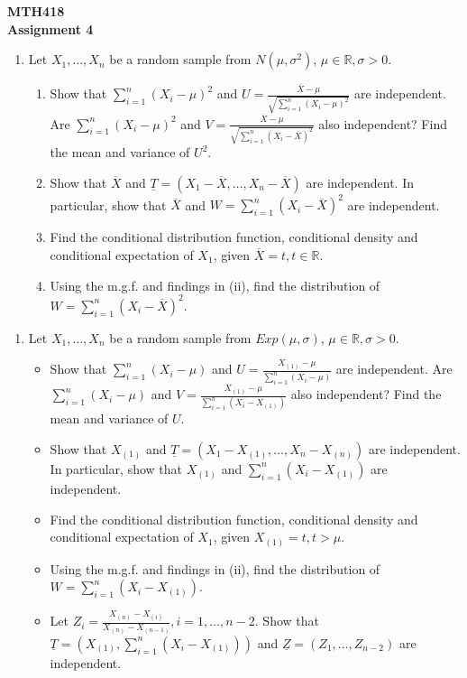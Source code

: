\documentclass[11pt]{article}
\begin{document}
\begin{center}
    \textbf{MTH418} \\
    \textbf{Assignment 4}
\end{center}

\begin{enumerate}
    \item[1.] Let $X_1, \dots, X_n$ be a random sample from $N(\mu, \sigma^2)$, $\mu \in \mathbb{R}, \sigma > 0$.
    \begin{enumerate}
        \item[(i)] Show that $\sum_{i=1}^n (X_i - \mu)^2$ and $U = \frac{\overline{X} - \mu}{\sqrt{\sum_{i=1}^n (X_i - \mu)^2}}$ are independent. Are $\sum_{i=1}^n (X_i - \mu)^2$ and $V = \frac{\overline{X} - \mu}{\sqrt{\sum_{i=1}^n (X_i - \overline{X})^2}}$ also independent? Find the mean and variance of $U^2$.
        \item[(ii)] Show that $\overline{X}$ and $\underline{T} = (X_1 - \overline{X}, \dots, X_n - \overline{X})$ are independent. In particular, show that $\overline{X}$ and $W = \sum_{i=1}^n (X_i - \overline{X})^2$ are independent.
        \item[(iii)] Find the conditional distribution function, conditional density and conditional expectation of $X_1$, given $\overline{X} = t, t \in \mathbb{R}$.
        \item[(iv)] Using the m.g.f. and findings in (ii), find the distribution of $W = \sum_{i=1}^n (X_i - \overline{X})^2$.
    \end{enumerate}
\end{enumerate}

\vspace{1em}

\begin{enumerate}
    \item[2.] Let $X_1, \dots, X_n$ be a random sample from $Exp(\mu, \sigma)$, $\mu \in \mathbb{R}, \sigma > 0$.
    \begin{itemize}
        \item[(i)] Show that $\sum_{i=1}^n(X_i - \mu)$ and $U = \frac{X_{(1)}-\mu}{\sum_{i=1}^n(X_i-\mu)}$ are independent. Are $\sum_{i=1}^n(X_i - \mu)$ and $V = \frac{X_{(1)}-\mu}{\sum_{i=1}^n(X_i-X_{(1)})}$ also independent? Find the mean and variance of $U$.
        \item[(ii)] Show that $X_{(1)}$ and $\underline{T} = (X_1 - X_{(1)}, \dots, X_n - X_{(n)})$ are independent. In particular, show that $X_{(1)}$ and $\sum_{i=1}^n(X_i - X_{(1)})$ are independent.
        \item[(iii)] Find the conditional distribution function, conditional density and conditional expectation of $X_1$, given $X_{(1)} = t, t > \mu$.
        \item[(iv)] Using the m.g.f. and findings in (ii), find the distribution of $W = \sum_{i=1}^n(X_i - X_{(1)})$.
        \item[(v)] Let $Z_i = \frac{X_{(n)}-X_{(i)}}{X_{(n)}-X_{(n-1)}}, i = 1, \dots, n-2$. Show that $\underline{T} = (X_{(1)}, \sum_{i=1}^n(X_i - X_{(1)}))$ and $\underline{Z} = (Z_1, \dots, Z_{n-2})$ are independent.
    \end{itemize}
\end{enumerate}
\end{document}
